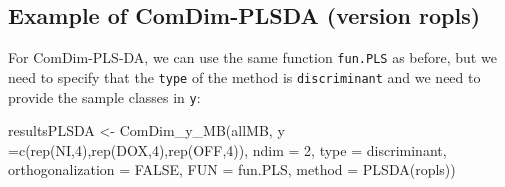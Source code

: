 \documentclass[
]{book}
\newenvironment{Shaded}{\begin{snugshade}}{\end{snugshade}}
\newcommand{\AttributeTok}[1]{\textcolor[rgb]{0.77,0.63,0.00}{#1}}
\newcommand{\CommentTok}[1]{\textcolor[rgb]{0.56,0.35,0.01}{\textit{#1}}}
\newcommand{\ConstantTok}[1]{\textcolor[rgb]{0.00,0.00,0.00}{#1}}
\newcommand{\DecValTok}[1]{\textcolor[rgb]{0.00,0.00,0.81}{#1}}
\newcommand{\FunctionTok}[1]{\textcolor[rgb]{0.00,0.00,0.00}{#1}}
\newcommand{\NormalTok}[1]{#1}
\newcommand{\OtherTok}[1]{\textcolor[rgb]{0.56,0.35,0.01}{#1}}
\newcommand{\SpecialCharTok}[1]{\textcolor[rgb]{0.00,0.00,0.00}{#1}}
\newcommand{\StringTok}[1]{\textcolor[rgb]{0.31,0.60,0.02}{#1}}
\begin{document}
\begin{Shaded}
\end{Shaded}

\hypertarget{example-of-comdim-plsda-version-ropls}{%
\subsection{Example of ComDim-PLSDA (version ropls)}\label{example-of-comdim-plsda-version-ropls}}

For ComDim-PLS-DA, we can use the same function \texttt{fun.PLS} as before, but we need
to specify that the \texttt{type} of the method is \texttt{\textquotesingle{}discriminant\textquotesingle{}} and we need to
provide the sample classes in \texttt{y}:

\begin{Shaded}
\begin{Highlighting}[]
\NormalTok{resultsPLSDA }\OtherTok{\textless{}{-}} \FunctionTok{ComDim\_y\_MB}\NormalTok{(allMB,}
                           \AttributeTok{y =}\FunctionTok{c}\NormalTok{(}\FunctionTok{rep}\NormalTok{(}\StringTok{\textquotesingle{}NI\textquotesingle{}}\NormalTok{,}\DecValTok{4}\NormalTok{),}\FunctionTok{rep}\NormalTok{(}\StringTok{\textquotesingle{}DOX\textquotesingle{}}\NormalTok{,}\DecValTok{4}\NormalTok{),}\FunctionTok{rep}\NormalTok{(}\StringTok{\textquotesingle{}OFF\textquotesingle{}}\NormalTok{,}\DecValTok{4}\NormalTok{)),}
                           \AttributeTok{ndim =} \DecValTok{2}\NormalTok{,}
                           \AttributeTok{type =} \StringTok{\textquotesingle{}discriminant\textquotesingle{}}\NormalTok{,}
                           \AttributeTok{orthogonalization =} \ConstantTok{FALSE}\NormalTok{,}
                           \AttributeTok{FUN =}\NormalTok{ fun.PLS,}
                           \AttributeTok{method =} \StringTok{\textquotesingle{}PLSDA(ropls)\textquotesingle{}}\NormalTok{)}
\end{Highlighting}
\end{Shaded}
\end{document}
